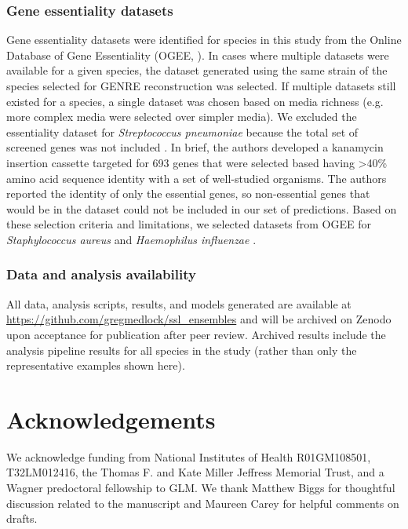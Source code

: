 \documentclass[11pt,twocolumn,notitlepage,openany,twoside]{book}
\begin{document}
\begin{refsection}
\subsubsection{Gene essentiality datasets}

Gene essentiality datasets were identified for species in this study from the Online Database of Gene Essentiality (OGEE, \cite{Chen2017-cs}). In cases where multiple datasets were available for a given species, the dataset generated using the same strain of the species selected for GENRE reconstruction was selected. If multiple datasets still existed for a species, a single dataset was chosen based on media richness (e.g. more complex media were selected over simpler media). We excluded the essentiality dataset for \textit{Streptococcus pneumoniae} because the total set of screened genes was not included \cite{Song2005-uc}. In brief, the authors developed a kanamycin insertion cassette targeted for 693 genes that were selected based having >40\% amino acid sequence identity with a set of well-studied organisms. The authors reported the identity of only the essential genes, so non-essential genes that would be in the dataset could not be included in our set of predictions. Based on these selection criteria and limitations, we selected datasets from OGEE for \textit{Staphylococcus aureus} \cite{Chaudhuri2009-za} and \textit{Haemophilus influenzae} \cite{Akerley2002-ja}.

\subsubsection{Data and analysis availability}

All data, analysis scripts, results, and models generated are available at \url{https://github.com/gregmedlock/ssl_ensembles} and will be archived on Zenodo upon acceptance for publication after peer review. Archived results include the analysis pipeline results for all species in the study (rather than only the representative examples shown here).

\section{Acknowledgements}

We acknowledge funding from National Institutes of Health R01GM108501, T32LM012416, the Thomas F. and Kate Miller Jeffress Memorial Trust, and a Wagner predoctoral fellowship to GLM. We thank Matthew Biggs for thoughtful discussion related to the manuscript and Maureen Carey for helpful comments on drafts.


\end{refsection}
\end{document}

